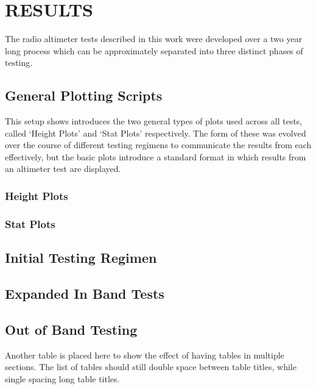 %
%
%
%

\chapter{RESULTS}
The radio altimeter tests described in this work were developed over a two year long process which can be approximately separated into three distinct phases of testing.  

\section{General Plotting Scripts}
This setup shows introduces the two general types of plots used across all tests, called `Height Plots' and `Stat Plots' respectively. The form of these was evolved over the course of different testing regimens to communicate the results from each effectively, but the basic plots introduce a standard format in which results from an altimeter test are displayed. 
\subsection{Height Plots}
\subsection{Stat Plots}

\section{Initial Testing Regimen}\label{sec:initial_results}

\section{Expanded In Band Tests}\label{sec:dvsg_ib_results}
\section{Out of Band Testing}\label{sec:dvsg_oob_results}
Another table is placed here to show the effect of having tables in multiple sections. The list of tables should still double space between table titles, while single spacing long table titles.

